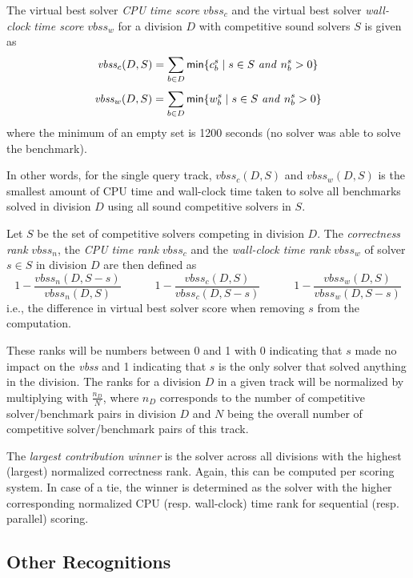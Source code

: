 \documentclass[12pt]{article}
\begin{document}
The virtual best solver \emph{CPU time score} $\mathit{vbss}_c$ and
the virtual best solver \emph{wall-clock time score} $\mathit{vbss}_w$ for a
division $D$ with competitive sound solvers $S$ is given as
\[
\mathit{vbss}_c(D,S) = \sum_{b \in D} {\sf min}\{ c_b^s \mid s \in S ~\mathit{and}~ n_b^s > 0 \}
\]
\[
\mathit{vbss}_w(D,S) = \sum_{b \in D} {\sf min}\{ w_b^s \mid s \in S ~\mathit{and}~ n_b^s > 0 \}
\]
where the minimum of an empty set is 1200 seconds
(no solver was able to solve the benchmark).

In other words, for the single query track,
$\mathit{vbss}_c(D,S)$  and $\mathit{vbss}_w(D,S)$ is the
smallest amount of CPU time and wall-clock time taken to solve all benchmarks
solved in division $D$ using all sound competitive solvers in $S$.

Let $S$ be the set of competitive solvers competing in division $D$.
The \emph{correctness rank} $\mathit{vbss}_n$, the \emph{CPU time rank}
$\mathit{vbss}_c$ and the \emph{wall-clock time rank} $\mathit{vbss}_w$
of solver $s \in S$ in division $D$ are then defined as
\[
1- \frac{\mathit{vbss}_n(D,S-s) }{ \mathit{vbss}_n (D,S)}
\hspace{3em}
1- \frac{\mathit{vbss}_c(D,S) }{ \mathit{vbss}_c(D,S-s)}
\hspace{3em}
1- \frac{\mathit{vbss}_w(D,S) }{ \mathit{vbss}_w(D,S-s)}
\]
i.e., the difference in virtual best solver score when removing $s$ from the
computation.

These ranks will be numbers between 0 and 1 with 0 indicating that $s$ made no
impact on the \emph{vbss} and 1 indicating that $s$ is the only solver that
solved anything in the division.
%
The ranks for a division $D$ in a given track will be normalized by multiplying
with $\frac{n_D}{N}$, where $n_D$ corresponds to the number of competitive
solver/benchmark pairs in division $D$ and $N$ being the overall number of
competitive solver/benchmark pairs of this track.

The \emph{largest contribution winner} is the solver across all divisions with
the highest (largest) normalized correctness rank. Again, this can be computed
per scoring system. In case of a tie, the winner is determined as the solver
with the higher corresponding normalized CPU (resp. wall-clock) time rank for
sequential (resp. parallel) scoring.

\subsection{Other Recognitions}
\end{document}
